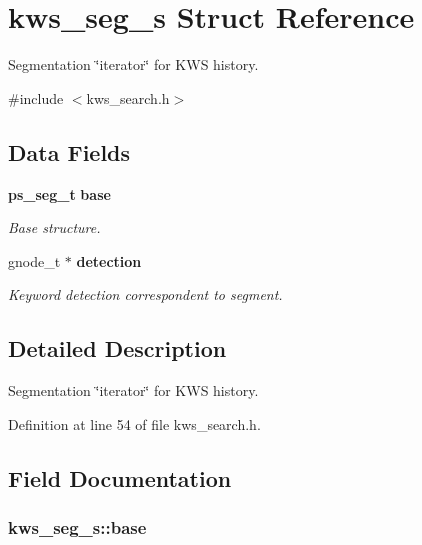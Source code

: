 \section{kws\-\_\-seg\-\_\-s Struct Reference}
\label{structkws__seg__s}


Segmentation \char`\"{}iterator\char`\"{} for K\-W\-S history.  




{\ttfamily \#include $<$kws\-\_\-search.\-h$>$}

\subsection*{Data Fields}
\begin{DoxyCompactItemize}
\item 
{\bf ps\-\_\-seg\-\_\-t} {\bf base}
\begin{DoxyCompactList}\small\item\em Base structure. \end{DoxyCompactList}\item 
gnode\-\_\-t $\ast$ {\bf detection}
\begin{DoxyCompactList}\small\item\em Keyword detection correspondent to segment. \end{DoxyCompactList}\end{DoxyCompactItemize}


\subsection{Detailed Description}
Segmentation \char`\"{}iterator\char`\"{} for K\-W\-S history. 

Definition at line 54 of file kws\-\_\-search.\-h.



\subsection{Field Documentation}
\subsubsection[{base}]{ kws\-\_\-seg\-\_\-s\-::base}\label{structkws__seg__s_ab8b059f475f5e64301195cf9816bde2a}


